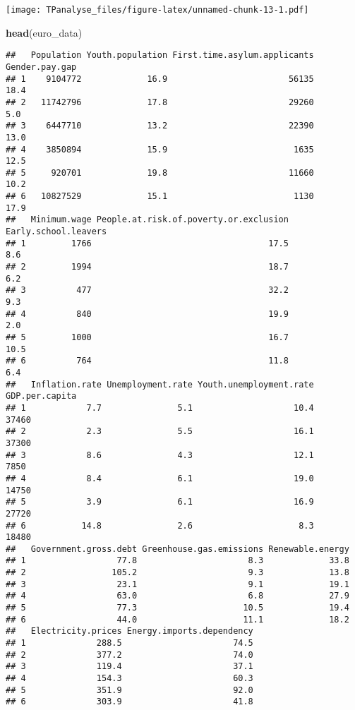 \documentclass[
]{article}
\newenvironment{Shaded}{\begin{snugshade}}{\end{snugshade}}
\newcommand{\FunctionTok}[1]{\textcolor[rgb]{0.13,0.29,0.53}{\textbf{#1}}}
\newcommand{\NormalTok}[1]{#1}
\begin{document}
\texttt{[image: TPanalyse\_files/figure-latex/unnamed-chunk-13-1.pdf]}

\begin{Shaded}
\begin{Highlighting}[]
\FunctionTok{head}\NormalTok{(euro\_data)}
\end{Highlighting}
\end{Shaded}

\begin{verbatim}
##   Population Youth.population First.time.asylum.applicants Gender.pay.gap
## 1    9104772             16.9                        56135           18.4
## 2   11742796             17.8                        29260            5.0
## 3    6447710             13.2                        22390           13.0
## 4    3850894             15.9                         1635           12.5
## 5     920701             19.8                        11660           10.2
## 6   10827529             15.1                         1130           17.9
##   Minimum.wage People.at.risk.of.poverty.or.exclusion Early.school.leavers
## 1         1766                                   17.5                  8.6
## 2         1994                                   18.7                  6.2
## 3          477                                   32.2                  9.3
## 4          840                                   19.9                  2.0
## 5         1000                                   16.7                 10.5
## 6          764                                   11.8                  6.4
##   Inflation.rate Unemployment.rate Youth.unemployment.rate GDP.per.capita
## 1            7.7               5.1                    10.4          37460
## 2            2.3               5.5                    16.1          37300
## 3            8.6               4.3                    12.1           7850
## 4            8.4               6.1                    19.0          14750
## 5            3.9               6.1                    16.9          27720
## 6           14.8               2.6                     8.3          18480
##   Government.gross.debt Greenhouse.gas.emissions Renewable.energy
## 1                  77.8                      8.3             33.8
## 2                 105.2                      9.3             13.8
## 3                  23.1                      9.1             19.1
## 4                  63.0                      6.8             27.9
## 5                  77.3                     10.5             19.4
## 6                  44.0                     11.1             18.2
##   Electricity.prices Energy.imports.dependency
## 1              288.5                      74.5
## 2              377.2                      74.0
## 3              119.4                      37.1
## 4              154.3                      60.3
## 5              351.9                      92.0
## 6              303.9                      41.8
\end{verbatim}
\end{document}
